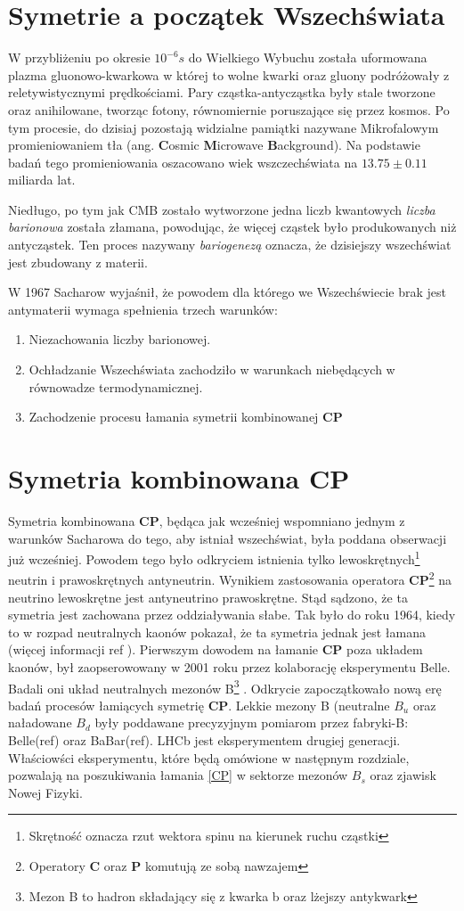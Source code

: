 \section{Symetrie a początek Wszechświata}
W przybliżeniu po okresie $10^{-6}s$ do Wielkiego Wybuchu została uformowana plazma gluonowo-kwarkowa w której to wolne kwarki oraz gluony podróżowały z reletywistycznymi prędkościami. Pary cząstka-antycząstka były stale tworzone oraz anihilowane, tworząc fotony, równomiernie poruszające się przez kosmos. Po tym procesie, do dzisiaj pozostają widzialne pamiątki nazywane Mikrofalowym promieniowaniem tła (ang. \textbf{C}osmic \textbf{M}icrowave \textbf{B}ackground). Na podstawie badań tego promieniowania oszacowano wiek wszczechświata na $13.75 \pm 0.11$ miliarda lat.

Niedługo, po tym jak CMB zostało wytworzone jedna liczb kwantowych \textit{liczba barionowa} została złamana, powodując, że więcej cząstek było produkowanych niż antycząstek. Ten proces nazywany \textit{bariogenezą} oznacza, że dzisiejszy wszechświat jest zbudowany z materii.

W 1967 Sacharow  wyjaśnił, że powodem dla którego we Wszechświecie brak jest antymaterii wymaga spełnienia trzech warunków:
\begin{enumerate}
\item Niezachowania liczby barionowej. 
\item Ochładzanie Wszechświata zachodziło w warunkach niebędących w równowadze termodynamicznej. 
\item Zachodzenie procesu łamania symetrii kombinowanej \textbf{CP} 
\end{enumerate}

\section{Symetria kombinowana \textbf{CP}}
Symetria kombinowana \textbf{CP}, będąca jak wcześniej wspomniano jednym z warunków Sacharowa do tego, aby istniał wszechświat, była poddana obserwacji już wcześniej. Powodem tego było odkryciem istnienia tylko lewoskrętnych\footnote{Skrętność oznacza rzut wektora spinu na kierunek ruchu cząstki} neutrin i prawoskrętnych antyneutrin. Wynikiem zastosowania operatora \textbf{CP}\footnote{Operatory \textbf{C} oraz \textbf{P} komutują ze sobą nawzajem} na neutrino lewoskrętne jest antyneutrino prawoskrętne. Stąd sądzono, że ta symetria jest zachowana przez oddziaływania słabe. Tak było do roku 1964, kiedy to w rozpad neutralnych kaonów pokazał, że ta symetria jednak jest łamana (więcej informacji ref ). Pierwszym dowodem na łamanie  \textbf{CP} poza układem kaonów, był zaopserowowany w 2001 roku przez kolaborację eksperymentu Belle. Badali oni układ neutralnych mezonów B\footnote{Mezon B to hadron składający się z kwarka b oraz lżejszy antykwark } . Odkrycie zapoczątkowało nową erę badań procesów łamiących symetrię  \textbf{CP}. Lekkie mezony B (neutralne $B_u$ oraz naładowane $B_d$ były poddawane precyzyjnym pomiarom przez fabryki-B: Belle(ref) oraz BaBar(ref). LHCb jest eksperymentem drugiej generacji. Właściowści eksperymentu, które będą omówione w następnym rozdziale, pozwalają na poszukiwania łamania \ref{CP}  w sektorze mezonów $B_{s}$ oraz zjawisk Nowej Fizyki.
